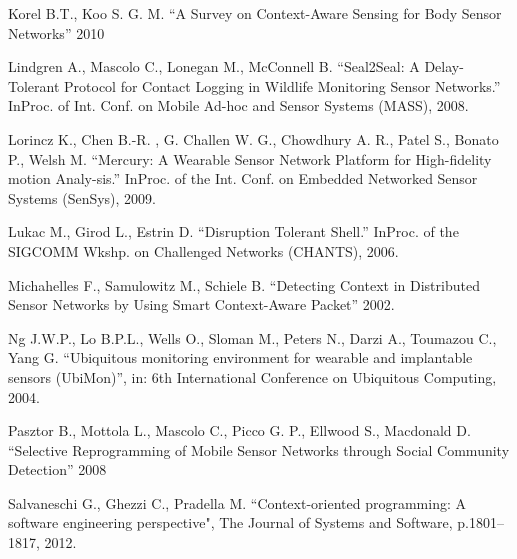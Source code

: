 \documentclass[12pt,a4paper]{article}
\begin{document}
\begin{thebibliography}{9}
  Korel B.T., Koo S. G. M. ``A Survey on Context-Aware Sensing for Body Sensor Networks'' 2010

  Lindgren A., Mascolo C., Lonegan M., McConnell B. ``Seal2Seal: A Delay-Tolerant Protocol for Contact Logging in Wildlife Monitoring Sensor Networks.'' InProc. of Int. Conf. on Mobile Ad-hoc and Sensor Systems (MASS), 2008.

  Lorincz K., Chen B.-R. , G. Challen W. G., Chowdhury A. R., Patel S., Bonato P., Welsh M. ``Mercury: A Wearable Sensor Network Platform for High-fidelity motion Analy-sis.'' InProc. of the Int. Conf. on Embedded Networked Sensor Systems (SenSys), 2009.

  Lukac M., Girod L., Estrin D. ``Disruption Tolerant Shell.'' InProc. of the SIGCOMM Wkshp. on Challenged Networks (CHANTS), 2006.

  Michahelles F., Samulowitz M., Schiele B. ``Detecting Context in Distributed Sensor Networks by Using Smart Context-Aware Packet'' 2002.

  Ng J.W.P., Lo B.P.L., Wells O., Sloman M., Peters N., Darzi A., Toumazou C., Yang G. ``Ubiquitous monitoring environment for wearable and implantable sensors (UbiMon)'', in: 6th International Conference on Ubiquitous Computing, 2004.

  Pasztor B., Mottola L., Mascolo C., Picco G. P., Ellwood S., Macdonald D.  ``Selective Reprogramming of Mobile Sensor Networks through Social Community Detection'' 2008

  Salvaneschi G., Ghezzi C., Pradella M. ``Context-oriented  programming:  A  software  engineering  perspective", The  Journal  of  Systems  and  Software, p.1801–1817, 2012.

\end{thebibliography}
\end{document}
